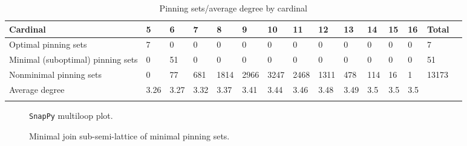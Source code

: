 \documentclass{article}%
\begin{document}
\begin{table}[ht]
	\caption{Pinning sets/average degree by cardinal}
	\centering
	\renewcommand{\arraystretch}{1.5}
	\begin{tabularx}{\textwidth}{lXXXXXXXXXXXXXX}
		\toprule
			Cardinal & 5 & 6 & 7 & 8 & 9 & 10 & 11 & 12 & 13 & 14 & 15 & 16 & Total\\
			\hline
			Optimal pinning sets & 7 & 0 & 0 & 0 & 0 & 0 & 0 & 0 & 0 & 0 & 0 & 0 & 7 \\
			Minimal (suboptimal) pinning sets & 0 & 51 & 0 & 0 & 0 & 0 & 0 & 0 & 0 & 0 & 0 & 0 & 51 \\
			Nonminimal pinning sets & 0 & 77 & 681 & 1814 & 2966 & 3247 & 2468 & 1311 & 478 & 114 & 16 & 1 & 13173 \\
			Average degree & 3.26 & 3.27 & 3.32 & 3.37 & 3.41 & 3.44 & 3.46 & 3.48 & 3.49 & 3.5 & 3.5 & 3.5 &  \\
		\bottomrule \\ 
	\end{tabularx}
\end{table}

\begin{multicols}{2}
\begin{figure}[H]
\centering

\caption{\texttt{SnapPy} multiloop plot.}
\label{fig:tex/img/[[10, 18, 1, 11], [11, 19, 12, 28], [4, 9, 5, 10], [5, 17, 6, 18], [1, 20, 2, 19], [12, 2, 13, 3], [3, 27, 4, 28], [22, 8, 23, 9], [23, 16, 24, 17], [6, 24, 7, 25], [20, 14, 21, 13], [21, 26, 22, 27],.svg}
\end{figure}
\columnbreak

\begin{figure}[H]
\centering
\scalebox{0.8}{}
\caption{Minimal join sub-semi-lattice of minimal pinning sets.}
\label{fig:tex/img/[[10, 18, 1, 11], [11, 19, 12, 28], [4, 9, 5, 10], [5, 17, 6, 18], [1, 20, 2, 19], [12, 2, 13, 3], [3, 27, 4, 28], [22, 8, 23, 9], [23, 16, 24, 17], [6, 24, 7, 25], [20, 14, 21, 13], [21, 26, 22, 27],.pgf}
\end{figure}
\end{multicols}
\end{document}
